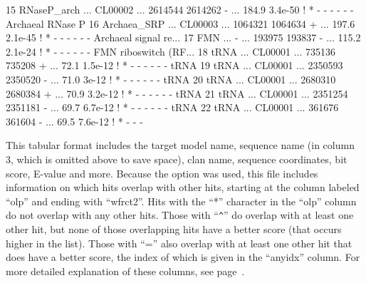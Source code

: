 \begin{tinysreoutput}
15   RNaseP_arch            ... CL00002   ...  2614544  2614262      - ...  184.9   3.4e-50  !   *       -      -      -      -      -      - Archaeal RNase P
16   Archaea_SRP            ... CL00003   ...  1064321  1064634      + ...  197.6   2.1e-45  !   *       -      -      -      -      -      - Archaeal signal re...
17   FMN                    ... -         ...   193975   193837      - ...  115.2   2.1e-24  !   *       -      -      -      -      -      - FMN riboswitch (RF...
18   tRNA                   ... CL00001   ...   735136   735208      + ...   72.1   1.5e-12  !   *       -      -      -      -      -      - tRNA
19   tRNA                   ... CL00001   ...  2350593  2350520      - ...   71.0     3e-12  !   *       -      -      -      -      -      - tRNA
20   tRNA                   ... CL00001   ...  2680310  2680384      + ...   70.9   3.2e-12  !   *       -      -      -      -      -      - tRNA
21   tRNA                   ... CL00001   ...  2351254  2351181      - ...   69.7   6.7e-12  !   *       -      -      -      -      -      - tRNA
22   tRNA                   ... CL00001   ...   361676   361604      - ...   69.5   7.6e-12  !   *       -      -      -     
\end{tinysreoutput}

This tabular format includes the target model name, sequence name (in
column 3, which is omitted above to save space), clan name, sequence
coordinates, bit score, E-value and more. Because the 
option was used, this file includes information on which hits overlap
with other hits, starting at the column labeled ``olp'' and ending
with ``wfrct2''. Hits with the ``*'' character in the ``olp'' column
do not overlap with any other hits. Those with ``\verb+^+'' do overlap with
at least one other hit, but none of those overlapping hits have a
better score (that occurs higher in the list). Those with ``='' also
overlap with at least one other hit that does have a better score, the
index of which is given in the ``anyidx'' column. For more detailed
explanation of these columns, see page~\pageref{tabular-format2}.

